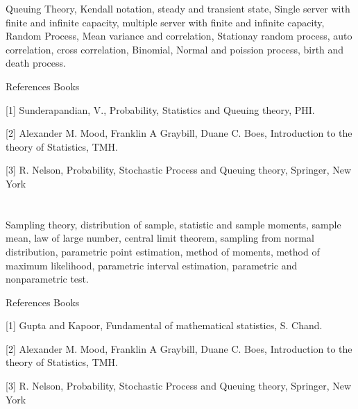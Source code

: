  

Queuing Theory, Kendall notation, steady and transient state, Single server with finite and infinite capacity, multiple server with finite and infinite capacity, Random Process, Mean variance and correlation, Stationay random process, auto correlation, cross correlation, Binomial, Normal and poission process, birth and death process. 

  

References Books  

[1] Sunderapandian, V., Probability, Statistics and Queuing theory, PHI. 

 [2] Alexander M. Mood, Franklin A Graybill, Duane C. Boes, Introduction to the theory of Statistics, TMH. 

 [3] R. Nelson, Probability, Stochastic Process and Queuing theory, Springer, New York 

                  
\section{\dsccourseinfo}

 

Sampling theory, distribution of sample, statistic and sample moments, sample mean, law of large number, central limit theorem, sampling from normal distribution, parametric point estimation, method of moments, method of maximum likelihood, parametric interval estimation, parametric and nonparametric test. 

 

References Books  

 [1] Gupta and Kapoor, Fundamental of mathematical statistics, S. Chand. 

 [2] Alexander M. Mood, Franklin A Graybill, Duane C. Boes, Introduction to the theory of Statistics, TMH. 

 [3] R. Nelson, Probability, Stochastic Process and Queuing theory, Springer, New York 

\section{\dsccourseinfo}

 

